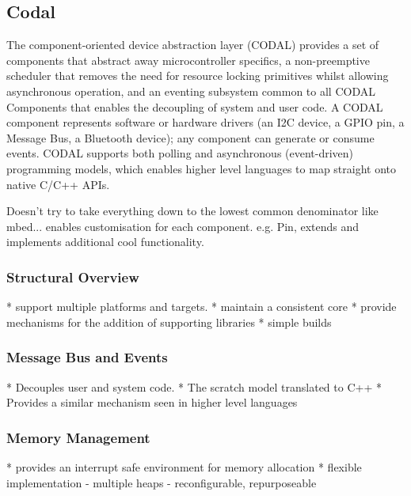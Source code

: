 

\subsection{Codal}

The component-oriented device abstraction layer (CODAL) provides a set of components that abstract away microcontroller specifics, a non-preemptive scheduler that removes the need for resource locking primitives whilst allowing asynchronous operation, and an eventing subsystem common to all CODAL Components that enables the decoupling of system and user code. A CODAL component represents software or hardware drivers (an I2C device, a GPIO pin, a Message Bus, a Bluetooth device); any component can generate or consume events. CODAL supports both polling and asynchronous (event-driven) programming models, which enables higher level languages to map straight onto native C/C++ APIs.

Doesn't try to take everything down to the lowest common denominator like mbed... enables customisation for each component. e.g. Pin, extends and implements additional cool functionality.

\subsubsection{Structural Overview}

* support multiple platforms and targets.
* maintain a consistent core
* provide mechanisms for the addition of supporting libraries
* simple builds

\subsubsection{Message Bus and Events}

* Decouples user and system code.
* The scratch model translated to C++
* Provides a similar mechanism seen in higher level languages

\subsubsection{Memory Management}

* provides an interrupt safe environment for memory allocation
* flexible implementation
    - multiple heaps
    - reconfigurable, repurposeable

